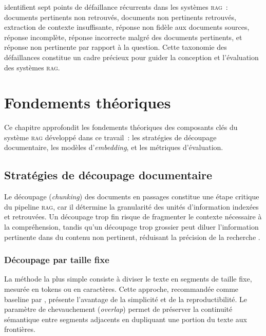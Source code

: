 \documentclass[12pt,a4paper,oneside]{report}
\newcommand{\rag}{\textsc{rag}}
\begin{document}
\citet{barnett2024} identifient sept points de défaillance récurrents dans les systèmes \rag{}~: documents pertinents non retrouvés, documents non pertinents retrouvés, extraction de contexte insuffisante, réponse non fidèle aux documents sources, réponse incomplète, réponse incorrecte malgré des documents pertinents, et réponse non pertinente par rapport à la question. Cette taxonomie des défaillances constitue un cadre précieux pour guider la conception et l'évaluation des systèmes \rag{}.


\chapter{Fondements théoriques}
\label{chap:fondements}

Ce chapitre approfondit les fondements théoriques des composants clés du système \rag{} développé dans ce travail~: les stratégies de découpage documentaire, les modèles d'\textit{embedding}, et les métriques d'évaluation.

\section{Stratégies de découpage documentaire}
\label{sec:chunking}

Le découpage (\textit{chunking}) des documents en passages constitue une étape critique du pipeline \rag{}, car il détermine la granularité des unités d'information indexées et retrouvées. Un découpage trop fin risque de fragmenter le contexte nécessaire à la compréhension, tandis qu'un découpage trop grossier peut diluer l'information pertinente dans du contenu non pertinent, réduisant la précision de la recherche \citep{gao2024}.

\subsection{Découpage par taille fixe}

La méthode la plus simple consiste à diviser le texte en segments de taille fixe, mesurée en tokens ou en caractères. Cette approche, recommandée comme baseline par \citet{gao2024}, présente l'avantage de la simplicité et de la reproductibilité. Le paramètre de chevauchement (\textit{overlap}) permet de préserver la continuité sémantique entre segments adjacents en dupliquant une portion du texte aux frontières.
\end{document}
